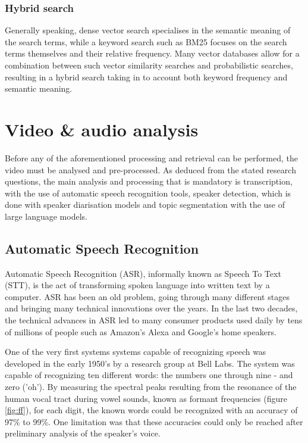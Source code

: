 \documentclass[twoside]{uva-inf-bachelor-thesis}
\begin{document}
\subsubsection{Hybrid search}
Generally speaking, dense vector search specialises in the semantic meaning of the search terms, while a keyword search such as BM25 focuses on the search terms themselves and their relative frequency. Many vector databases allow for a combination between such vector similarity searches and probabilistic searches, resulting in a hybrid search taking in to account both keyword frequency and semantic meaning. 


\section{Video \& audio analysis}
Before any of the aforementioned processing and retrieval can be performed, the video must be analysed and pre-processed. As deduced from the stated research questions, the main analysis and processing that is mandatory is transcription, with the use of automatic speech recognition tools, speaker detection, which is done with speaker diarisation models and topic segmentation with the use of large language models.

\subsection{Automatic Speech Recognition}
Automatic Speech Recognition (ASR), informally known as Speech To Text (STT), is the act of transforming spoken language into written text by a computer. ASR has been an old problem, going through many different stages and bringing many technical innovations over the years. 
In the last two decades, the technical advances in ASR led to many consumer products used daily by tens of millions of people such as Amazon's Alexa and Google's home speakers.

One of the very first systems systems capable of recognizing speech was developed in the early 1950's by a research group at Bell Labs. The system was capable of recognizing ten different words: the numbers one through nine - and zero ('oh'). By measuring the spectral peaks resulting from the resonance of the human vocal tract during vowel sounds, known as formant frequencies (figure \ref{fig:ff}), for each digit, the known words could be recognized with an accuracy of 97\% to 99\%. One limitation was that these accuracies could only be reached after preliminary analysis of the speaker's voice. \cite{davis1952automatic, Juang05}
\end{document}
